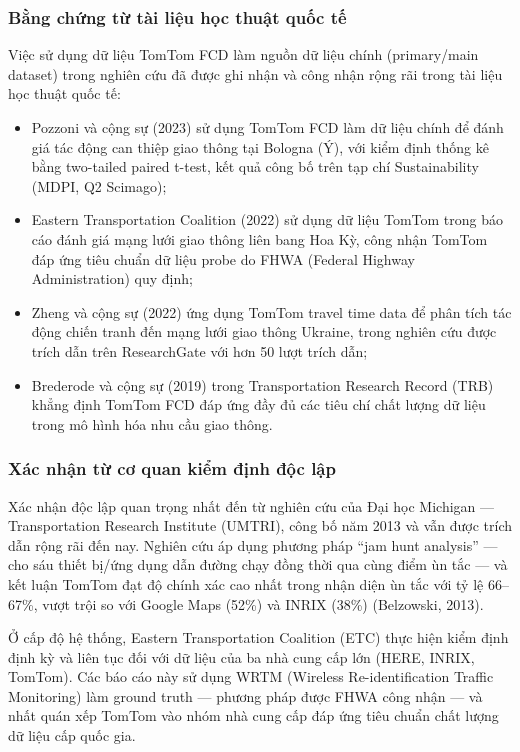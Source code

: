 \subsubsection{Bằng chứng từ tài liệu học thuật quốc tế}
Việc sử dụng dữ liệu TomTom FCD làm nguồn dữ liệu chính (primary/main dataset) trong nghiên cứu đã được ghi nhận và công nhận rộng rãi trong tài liệu học thuật quốc tế:
\begin{itemize}
    \item Pozzoni và cộng sự (2023) sử dụng TomTom FCD làm dữ liệu chính để đánh giá tác động can thiệp giao thông tại Bologna (Ý), với kiểm định thống kê bằng two-tailed paired t-test, kết quả công bố trên tạp chí Sustainability (MDPI, Q2 Scimago);

    \item Eastern Transportation Coalition (2022) sử dụng dữ liệu TomTom trong báo cáo đánh giá mạng lưới giao thông liên bang Hoa Kỳ, công nhận TomTom đáp ứng tiêu chuẩn dữ liệu probe do FHWA (Federal Highway Administration) quy định;

    \item Zheng và cộng sự (2022) ứng dụng TomTom travel time data để phân tích tác động chiến tranh đến mạng lưới giao thông Ukraine, trong nghiên cứu được trích dẫn trên ResearchGate với hơn 50 lượt trích dẫn;

    \item Brederode và cộng sự (2019) trong Transportation Research Record (TRB) khẳng định TomTom FCD đáp ứng đầy đủ các tiêu chí chất lượng dữ liệu trong mô hình hóa nhu cầu giao thông.
\end{itemize}

\subsubsection{Xác nhận từ cơ quan kiểm định độc lập}
Xác nhận độc lập quan trọng nhất đến từ nghiên cứu của Đại học Michigan --- Transportation Research Institute (UMTRI), công bố năm 2013 và vẫn được trích dẫn rộng rãi đến nay. Nghiên cứu áp dụng phương pháp ``jam hunt analysis'' --- cho sáu thiết bị/ứng dụng dẫn đường chạy đồng thời qua cùng điểm ùn tắc --- và kết luận TomTom đạt độ chính xác cao nhất trong nhận diện ùn tắc với tỷ lệ 66--67\%, vượt trội so với Google Maps (52\%) và INRIX (38\%) (Belzowski, 2013).

Ở cấp độ hệ thống, Eastern Transportation Coalition (ETC) thực hiện kiểm định định kỳ và liên tục đối với dữ liệu của ba nhà cung cấp lớn (HERE, INRIX, TomTom). Các báo cáo này sử dụng WRTM (Wireless Re-identification Traffic Monitoring) làm ground truth --- phương pháp được FHWA công nhận --- và nhất quán xếp TomTom vào nhóm nhà cung cấp đáp ứng tiêu chuẩn chất lượng dữ liệu cấp quốc gia.

